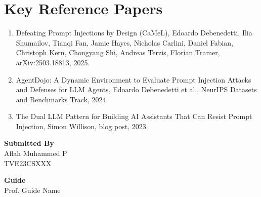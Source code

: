 \documentclass[12pt]{article}
\newcommand{\studentname}{Aflah Muhammed P}
\newcommand{\rollno}{TVE23CSXXX}
\newcommand{\guidename}{Prof. Guide Name}
\begin{document}
\section*{Key Reference Papers}
\begin{enumerate}
  \item Defeating Prompt Injections by Design (CaMeL), Edoardo Debenedetti, Ilia Shumailov, Tianqi Fan, Jamie Hayes, Nicholas Carlini, Daniel Fabian, Christoph Kern, Chongyang Shi, Andreas Terzis, Florian Tramer, arXiv:2503.18813, 2025.
  \item AgentDojo: A Dynamic Environment to Evaluate Prompt Injection Attacks and Defenses for LLM Agents, Edoardo Debenedetti et al., NeurIPS Datasets and Benchmarks Track, 2024.
  \item The Dual LLM Pattern for Building AI Assistants That Can Resist Prompt Injection, Simon Willison, blog post, 2023.
\end{enumerate}
\vspace{1.5em}

\noindent\textbf{Submitted By}\\
\studentname\\
\rollno

\vspace{1em}
\noindent\textbf{Guide}\\
\guidename
\end{document}
